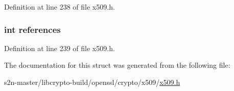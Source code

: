 Definition at line 238 of file x509.\+h.

\subsubsection[{\texorpdfstring{references}{references}}]{\setlength{\rightskip}{0pt plus 5cm}int references}\hypertarget{struct_x509__req__st_a146fdb34d9a909e530adf8b189481195}{}\label{struct_x509__req__st_a146fdb34d9a909e530adf8b189481195}


Definition at line 239 of file x509.\+h.



The documentation for this struct was generated from the following file\+:\begin{DoxyCompactItemize}
\item 
s2n-\/master/libcrypto-\/build/openssl/crypto/x509/\hyperlink{crypto_2x509_2x509_8h}{x509.\+h}\end{DoxyCompactItemize}
